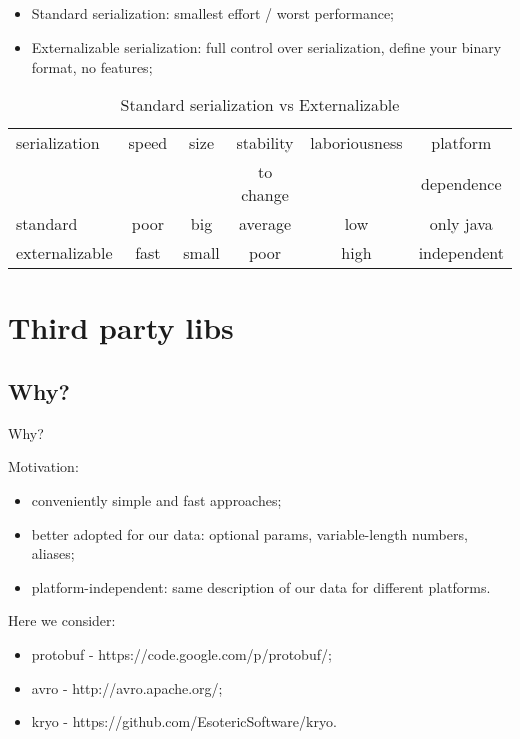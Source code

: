 \documentclass[8pt]{beamer}
\begin{document}
\subsection{\partname}
\begin{frame}{\partname}
  \begin{itemize}
    \item Standard serialization: smallest effort / worst performance;
    \item Externalizable serialization: full control over serialization, define your binary format, no features;
  \end{itemize}
  \begin{table}
    \begin{tabular}{l | c | c | c | c | c }
      serialization  & speed & size & stability & laboriousness & platform \\
      &       &      & to change &               & dependence\\
      \hline \hline
      standard       & poor & big   & average & low  & only java  \\
      \hline
      externalizable & fast & small & poor    & high & independent
    \end{tabular}

    \caption{Standard serialization vs Externalizable}
  \end{table}

\end{frame}

\section{Third party libs}
\renewcommand{\partname}{Why?}
\subsection{\partname}
\begin{frame}{\partname}

  Motivation:
  \begin{itemize}
    \item conveniently simple and fast approaches;
    \item better adopted for our data: optional params, variable-length numbers, aliases;
    \item platform-independent: same description of our data for different platforms.
  \end{itemize}

  Here we consider:
  \begin{itemize}
    \item protobuf - https://code.google.com/p/protobuf/;
    \item avro - http://avro.apache.org/;
    \item kryo - https://github.com/EsotericSoftware/kryo.
  \end{itemize}
\end{frame}
\end{document}
